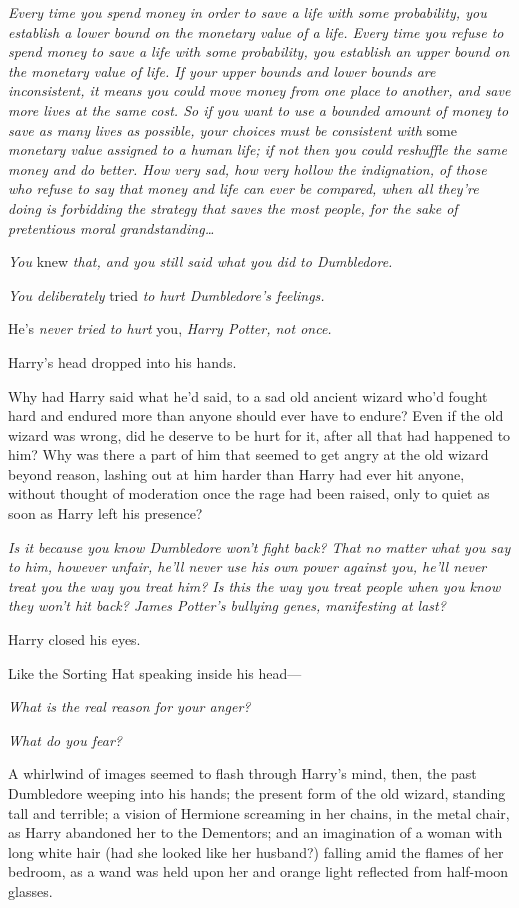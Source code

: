 \emph{Every time you spend money in order to save a life with some probability,
you establish a lower bound on the monetary value of a life. Every time you
refuse to spend money to save a life with some probability, you establish an
upper bound on the monetary value of life. If your upper bounds and lower
bounds are inconsistent, it means you could move money from one place to
another, and save more lives at the same cost. So if you want to use a bounded
amount of money to save as many lives as possible, your choices must be
consistent with} some \emph{monetary value assigned to a human life; if not
then you could reshuffle the same money and do better. How very sad, how very
hollow the indignation, of those who refuse to say that money and life can ever
be compared, when all they're doing is forbidding the strategy that saves the
most people, for the sake of pretentious moral grandstanding{\ldots}}

\emph{You} knew \emph{that, and you still said what you did to Dumbledore.}

\emph{You deliberately} tried \emph{to hurt Dumbledore's feelings.}

He's \emph{never tried to hurt} you, \emph{Harry Potter, not once.}

Harry's head dropped into his hands.

Why had Harry said what he'd said, to a sad old ancient wizard who'd fought
hard and endured more than anyone should ever have to endure? Even if the old
wizard was wrong, did he deserve to be hurt for it, after all that had happened
to him? Why was there a part of him that seemed to get angry at the old wizard
beyond reason, lashing out at him harder than Harry had ever hit anyone,
without thought of moderation once the rage had been raised, only to quiet as
soon as Harry left his presence?

\emph{Is it because you know Dumbledore won't fight back? That no matter what
you say to him, however unfair, he'll never use his own power against you,
he'll never treat you the way you treat him? Is this the way you treat people
when you know they won't hit back? James Potter's bullying genes, manifesting
at last?}

Harry closed his eyes.

Like the Sorting Hat speaking inside his head---

\emph{What is the real reason for your anger?}

\emph{What do you fear?}

A whirlwind of images seemed to flash through Harry's mind, then, the past
Dumbledore weeping into his hands; the present form of the old wizard, standing
tall and terrible; a vision of Hermione screaming in her chains, in the metal
chair, as Harry abandoned her to the Dementors; and an imagination of a woman
with long white hair (had she looked like her husband?) falling amid the flames
of her bedroom, as a wand was held upon her and orange light reflected from
half-moon glasses.

